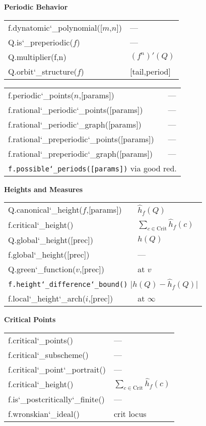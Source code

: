 \documentclass{amsart}
\newcommand{\Section}[1]{\filbreak\par\vspace{5pt}\noindent\textbf{#1}\par\noindent\ignorespaces}
\newcommand{\us}{\char`\_}  %
\begin{document}
\begin{multicols}{3}
\Section{Periodic Behavior}
\noindent
\begin{tabular}{@{\ttfamily\enspace}ll}
f.dynatomic\us polynomial([$m$,$n$]) & ---\\
Q.is\us preperiodic($f$) & ---\\
Q.multiplier(f,n) & $(f^n)'(Q)$\\
Q.orbit\us structure($f$) & [tail,period] \\
\end{tabular}
\par\noindent
\begin{tabular}{@{\ttfamily\enspace}ll}
f.periodic\us points($n$,[params]) & ---\\
f.rational\us periodic\us points([params]) & ---\\
f.rational\us periodic\us graph([params]) & ---\\
f.rational\us preperiodic\us points([params]) & ---\\
f.rational\us preperiodic\us graph([params]) & ---\\
\multicolumn{2}{l}{\texttt{f.possible\us periods([params])} \quad via good red.}
\end{tabular}


\Section{Heights and Measures}
\noindent
\begin{tabular}{@{\ttfamily\enspace}ll}
Q.canonical\us height($f$,[params]) & $\hat{h}_f(Q)$\\
f.critical\us height() & $\sum_{c \in \text{Crit}} \hat{h}_f(c)$\\
Q.global\us height([prec]) & $h(Q)$\\
f.global\us height([prec]) &  ---\\
Q.green\us function($v$,[prec]) &  at $v$\\
\multicolumn{2}{l}{\texttt{f.height\us difference\us bound()} \quad $\bigl|h(Q) - \hat{h}_f(Q)\bigr|$}\\
f.local\us height\us arch($i$,[prec]) & at $\infty$
\end{tabular}

\Section{Critical Points}
\noindent
\begin{tabular}{@{\ttfamily\enspace}ll}
f.critical\us points() & ---\\
f.critical\us subscheme() & ---\\
f.critical\us point\us portrait() & ---\\
f.critical\us height() & $\sum_{c \in \text{Crit}} \hat{h}_f(c)$\\
f.is\us postcritically\us finite() & ---\\
f.wronskian\us ideal() & crit locus
\end{tabular}


\end{multicols}
\end{document}
